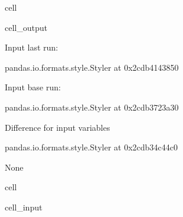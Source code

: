 \documentclass[letterpaper,10pt,english]{jupyterBook}
\begin{document}
\begin{sphinxuseclass}{cell}
\begin{sphinxVerbatimOutput}
\begin{sphinxuseclass}{cell_output}
\begin{sphinxVerbatim}[commandchars=\\\{\}]
Input last run:
\end{sphinxVerbatim}

\begin{sphinxVerbatim}[commandchars=\\\{\}]
\PYGZlt{}pandas.io.formats.style.Styler at 0x2cdb4143850\PYGZgt{}
\end{sphinxVerbatim}

\begin{sphinxVerbatim}[commandchars=\\\{\}]
Input base run:
\end{sphinxVerbatim}

\begin{sphinxVerbatim}[commandchars=\\\{\}]
\PYGZlt{}pandas.io.formats.style.Styler at 0x2cdb3723a30\PYGZgt{}
\end{sphinxVerbatim}

\begin{sphinxVerbatim}[commandchars=\\\{\}]
Difference for input variables
\end{sphinxVerbatim}

\begin{sphinxVerbatim}[commandchars=\\\{\}]
\PYGZlt{}pandas.io.formats.style.Styler at 0x2cdb34c44c0\PYGZgt{}
\end{sphinxVerbatim}

\begin{sphinxVerbatim}[commandchars=\\\{\}]
None
\end{sphinxVerbatim}

\end{sphinxuseclass}\end{sphinxVerbatimOutput}

\end{sphinxuseclass}
\begin{sphinxuseclass}{cell}\begin{sphinxVerbatimInput}

\begin{sphinxuseclass}{cell_input}
\begin{sphinxVerbatim}[commandchars=\\\{\}]
\end{sphinxVerbatim}

\end{sphinxuseclass}\end{sphinxVerbatimInput}

\end{sphinxuseclass}
\end{document}

